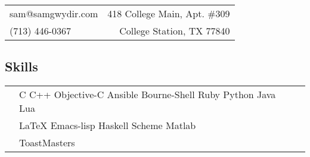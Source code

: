\documentclass[resmargin,line,12pt]{res}
\begin{document}
\hfill
\vspace*{-.45in}
\begin{tabular}{l r}
sam@samgwydir.com & 418 College Main, Apt. \#309\\
(713) 446-0367 & College Station, TX 77840
\end{tabular}

\vspace*{.1in}
{\color{Black}
\begin{resume}

\vspace*{.05in}
{\color{Black}
  \vspace{-.10in}
  \section{\sc Skills}}
\hspace{-.35in}
{\renewcommand{\arraystretch}{1.25}
  \renewcommand{\tabcolsep}{0.175cm}
  \begin{tabular}{l l l}
    & C C++ Objective-C Ansible Bourne-Shell Ruby Python Java Lua & \\
    & \LaTeX{} Emacs-lisp Haskell Scheme Matlab & \\
    & ToastMasters & \\
  \end{tabular}}



\end{resume}}
\end{document}
